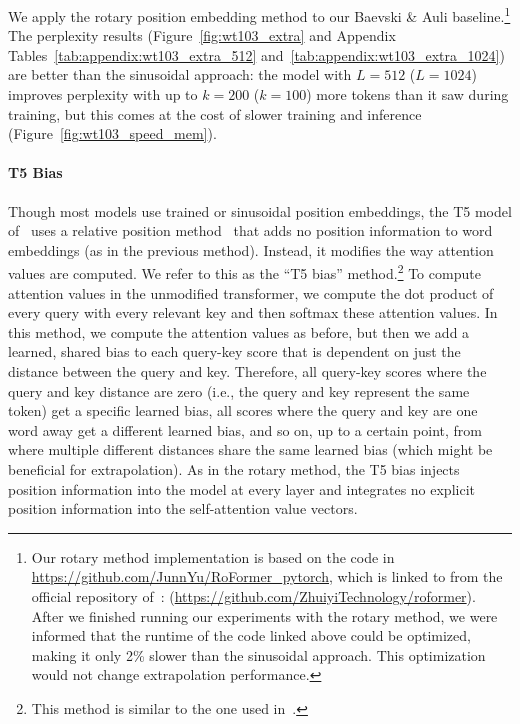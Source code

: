 We apply the rotary position embedding method to our Baevski \& Auli baseline.\footnote{Our rotary method implementation is based on the code in \url{https://github.com/JunnYu/RoFormer_pytorch}, which is linked to from the official repository of~\cite{roformer}: (\url{https://github.com/ZhuiyiTechnology/roformer}). After we finished running our experiments with the rotary method, we were informed that the runtime of the code linked above could be optimized, making it only 2\% slower than the sinusoidal approach. This optimization would not change extrapolation performance.}
The perplexity results (Figure~\ref{fig:wt103_extra} and Appendix Tables~\ref{tab:appendix:wt103_extra_512} and~\ref{tab:appendix:wt103_extra_1024}) are better than the sinusoidal approach: the model with $L=512$ ($L=1024$) improves perplexity with up to $k=200$ ($k=100$) more tokens than it saw during training, but this comes at the cost of slower training and inference (Figure~\ref{fig:wt103_speed_mem}). %

\paragraph{T5 Bias}
Though most models use trained or sinusoidal position embeddings, the T5 model of~\cite{t5} uses a relative position method~\citep{shaw,Huang2019MusicTG} that adds no  position information to word embeddings (as in the previous method). Instead, it  %
modifies the way attention values are computed. We refer to this as the ``T5 bias'' method.\footnote{This method is similar to the one used in~\citet[Equation 7]{parikh-etal-2016-decomposable}.} To compute attention values in the unmodified transformer, we compute the dot product of every query with every relevant key %
and then softmax these attention values. In this method, we compute the attention values as before, %
but then we add a learned, shared bias to each query-key score that is dependent on just the distance between the query and key. Therefore, all query-key scores where the query and key distance are zero (i.e., the query and key represent the same token) get a specific learned bias, all scores where the query and key are one word away get a different learned bias, and so on, up to a certain point, from where multiple different distances share the same learned bias (which might be beneficial for extrapolation). %
As in the rotary method, the T5 bias injects position information into the model at every layer and integrates no explicit position information into the %
self-attention value vectors. 

